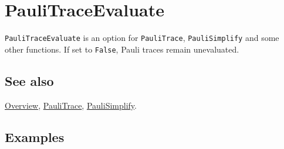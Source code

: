 \documentclass[../FeynCalcManual.tex]{subfiles}
\begin{document}
\hypertarget{paulitraceevaluate}{%
\section{PauliTraceEvaluate}\label{paulitraceevaluate}}

\texttt{PauliTraceEvaluate} is an option for \texttt{PauliTrace},
\texttt{PauliSimplify} and some other functions. If set to
\texttt{False}, Pauli traces remain unevaluated.

\subsection{See also}

\hyperlink{toc}{Overview}, \hyperlink{paulitrace}{PauliTrace},
\hyperlink{paulisimplify}{PauliSimplify}.

\subsection{Examples}
\end{document}
